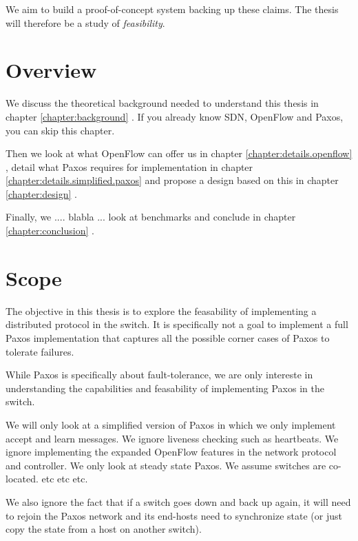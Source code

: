 We aim to build a proof-of-concept system backing up these claims.  The
thesis will therefore be a study of \textit{feasibility}.

\section{Overview}

We discuss the theoretical background needed to understand this thesis in
chapter \ref{chapter:background} .  If you already know \acs{SDN},
OpenFlow and Paxos, you can skip this chapter.

Then we look at what OpenFlow can offer us in chapter
\ref{chapter:details.openflow}
, detail what Paxos requires for
implementation in chapter \ref{chapter:details.simplified.paxos} 
 and propose a
design based on this in chapter \ref{chapter:design} .

Finally, we .... blabla ... look at benchmarks and conclude in chapter
\ref{chapter:conclusion} .

\section{Scope}

The objective in this thesis is to explore the feasability of implementing a
distributed protocol in the switch.  It is specifically not a goal to
implement a full Paxos implementation that captures all the possible corner
cases of Paxos to tolerate failures.
%

While Paxos is specifically about fault-tolerance, we are only intereste in
understanding the capabilities and feasability of implementing Paxos in the
switch.

We will only look at a simplified version of Paxos in which we only
implement accept and learn messages. We ignore liveness checking such as
heartbeats. We ignore implementing the expanded OpenFlow features in the
network protocol and controller. We only look at steady state Paxos.
We assume switches are co-located. etc etc etc.

We also ignore the fact that if a switch goes down and back up again, it
will need to rejoin the Paxos network and its end-hosts need to synchronize
state (or just copy the state from a host on another switch).

